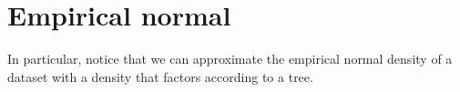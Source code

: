 \section*{Empirical normal}

In particular, notice that we can approximate the empirical normal density of a dataset with a density that factors according to a tree.
